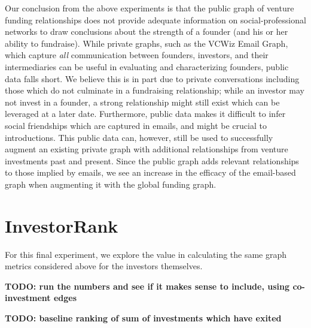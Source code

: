 Our conclusion from the above experiments is that the public graph of venture funding relationships does not provide adequate information on social-professional networks to draw conclusions about the strength of a founder (and his or her ability to fundraise). While private graphs, such as the VCWiz Email Graph, which capture \textit{all} communication between founders, investors, and their intermediaries can be useful in evaluating and characterizing founders, public data falls short. We believe this is in part due to private conversations including those which do not culminate in a fundraising relationship; while an investor may not invest in a founder, a strong relationship might still exist which can be leveraged at a later date. Furthermore, public data makes it difficult to infer social friendships which are captured in emails, and might be crucial to introductions. This public data can, however, still be used to successfully augment an existing private graph with additional relationships from venture investments past and present. Since the public graph adds relevant relationships to those implied by emails, we see an increase in the efficacy of the email-based graph when augmenting it with the global funding graph.

\section{InvestorRank}

For this final experiment, we explore the value in calculating the same graph metrics considered above for the investors themselves.

\textbf{TODO: run the numbers and see if it makes sense to include, using co-investment edges}

\textbf{TODO: baseline ranking of sum of investments which have exited}



